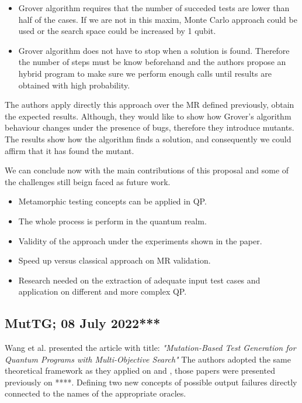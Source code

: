 \begin{itemize}
\begin{itemize}
    \item Grover algorithm requires that the number of succeded tests are lower than half of the cases. If we are not in this maxim, Monte Carlo approach could be used or the search space could be increased by 1 qubit.
    \item Grover algorithm does not have to stop when a solution is found. Therefore the number of steps must be know beforehand and the authors propose an hybrid program to make sure we perform enough calls until results are obtained with high probability.
\end{itemize}

The authors apply directly this approach over the MR defined previously, obtain the expected results. Although, they would like to show how Grover's algorithm behaviour changes under the presence of bugs, therefore they introduce mutants. The results show how the algorithm finds a solution, and consequently we could affirm that it has found the mutant.

We can conclude now with the main contributions of this proposal and some of the challenges still beign faced as future work.

\begin{itemize}
    \item Metamorphic testing concepts can be applied in QP.
    \item The whole process is perform in the quantum realm.
    \item Validity of the approach under the experiments shown in the paper.
    \item Speed up versus classical approach on MR validation.
    \item Research needed on the extraction of adequate input test cases and application on different and more complex QP.
\end{itemize}

\vspace{15pt}
\subsection{MutTG; 08 July 2022***}

Wang et al. presented the article with title: \textit{"Mutation-Based Test Generation for Quantum Programs with Multi-Objective Search"}\cite{wang2022mutation} The authors adopted the same theoretical framework as they applied on \cite{ali2021assessing} and \cite{wang2021quito}, those papers were presented previously on ****. Defining two new concepts of possible output failures directly connected to the names of the appropriate oracles.\newline


\end{itemize}
